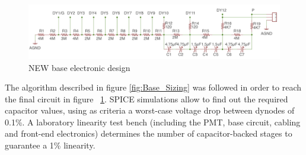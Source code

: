 \documentclass[a4paper, 10pt, oneside, twocolumn, 3p]{elsarticle}
\begin{document}
\begin{figure}[ht]
  \begin{center}
   	 \includegraphics[width=\textwidth]{./figures/base_sch.png}    
   	 \caption{NEW base electronic design}
   	 \label{fig:BASE}
  \end{center}
\end{figure}



\par The algorithm described in figure \ref{fig:Base_Sizing} was followed in order to reach the final circuit in figure ~\ref{fig:BASE}. SPICE simulations allow to find out the required capacitor values, using as criteria a worst-case voltage drop between dynodes of 0.1\%. A laboratory linearity test bench (including the PMT, base circuit, cabling and front-end electronics) determines the number of capacitor-backed stages to guarantee a 1\% linearity.
\end{document}
